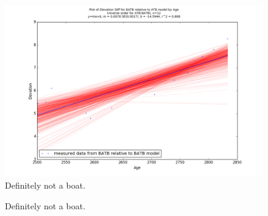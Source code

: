 \begin{figure}[t]
	\includegraphics[width=\linewidth]{data/gias/theGIA_BATB_relative_to_ATB.png}
	\caption{Definitely not a boat.}
	\label{fig:gias_BATBxATB}
\end{figure}
\newpage



\begin{figure}[h]
	\caption{Definitely not a boat.}
	\label{fig:data_TAHBxBATB}
\end{figure}
\newpage

